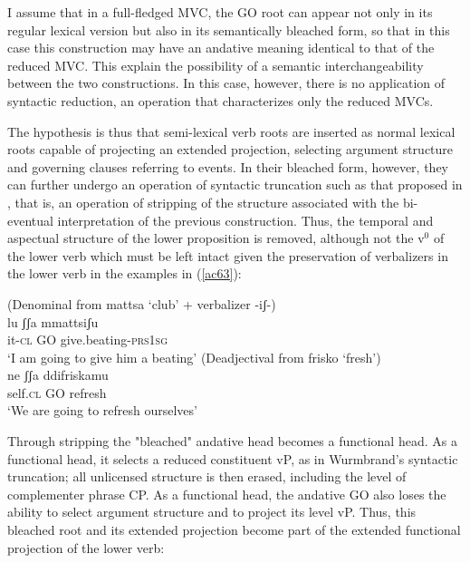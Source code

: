 \documentclass[output=paper]{langscibook}
\begin{document}
I assume that in a full-fledged MVC, the GO root can appear not only in its regular lexical version but also in its semantically bleached form, so that in this case this construction may have an andative meaning identical to that of the reduced MVC. This explain the possibility of a semantic interchangeability between the two constructions. In this case, however, there is no application of syntactic reduction, an operation that characterizes only the reduced MVCs.

The hypothesis is thus that semi-lexical verb roots are inserted as normal lexical roots capable of projecting an extended projection, selecting argument structure and governing clauses referring to events.  In their bleached form, however, they can further undergo an operation of syntactic truncation such as that proposed in \citet{wurmbrand2014a, wurmbrand2015, wurmbrand2017verb}, that is, an operation of stripping of the structure associated with the bi-eventual interpretation of the previous construction. Thus, the temporal and aspectual structure of the lower proposition is removed, although not the v$^0$ of the lower verb which must be left intact given the preservation of verbalizers in the lower verb in the examples in (\ref{ac63}):

\ea \label{ac63}
\ea (Denominal from mattsa ‘club’ + verbalizer -iʃ-)\label{ac63a}\\
\gll lu     ʃʃa  mmattsiʃu\\
     it-\textsc{cl} GO  give.beating-\textsc{prs}\textsc{1sg}\\
 \glt ‘I am going to give him a beating’
\ex (Deadjectival from frisko ‘fresh’)\\
\label{ac63b}\gll ne    ʃʃa   ddifriskamu\\
 self.\textsc{cl}  GO  refresh\\
 \glt ‘We are going to refresh ourselves’
    \z
\z

Through stripping the "bleached" andative head becomes a functional head. As a functional head, it selects a reduced constituent vP, as in Wurmbrand's syntactic truncation; all unlicensed structure is then erased, including the level of complementer  phrase CP. As a functional head, the andative GO also loses the ability to select argument structure and to project its level vP. Thus, this bleached root and its extended projection become part of the extended functional projection of the lower verb:
\end{document}
